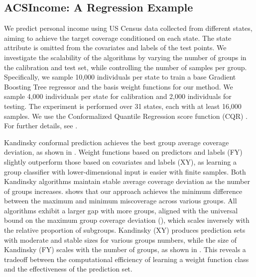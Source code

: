 \subsection{ACSIncome: A Regression Example}
We predict personal income using US Census data collected from different states, aiming to achieve the target coverage conditioned on each state. The state attribute is omitted from the covariates and labels of the test points. We investigate the scalability of the algorithms by varying the number of groups in the calibration and test set, while controlling the number of samples per group. Specifically, we sample 10,000 individuals per state to train a base Gradient Boosting Tree regressor and the basis weight functions for our method. We sample 4,000 individuals per state for calibration and 2,000 individuals for testing. The experiment is performed over 31 states, each with at least 16,000 samples. We use the Conformalized Quantile Regression score function (CQR) \citep{RPC19}. For further details, see .

Kandinsky conformal prediction achieves the best group average coverage deviation, as shown in . Weight functions based on predictors and labels (FY) slightly outperform those based on covariates and labels (XY), as learning a group classifier with lower-dimensional input is easier with finite samples. Both Kandinsky algorithms maintain stable average coverage deviation as the number of groups increases.  shows that our approach achieves the minimum difference between the maximum and minimum miscoverage across various groups. All algorithms exhibit a larger gap with more groups, aligned with the universal bound on the maximum group coverage deviation (), which scales inversely with the relative proportion of subgroups. Kandinsky (XY) produces prediction sets with moderate and stable sizes for various groups numbers, while the size of Kandinsky (FY) scales with the number of groups, as shown in . This reveals a tradeoff between the computational efficiency of learning a weight function class and the effectiveness of the prediction set. 

